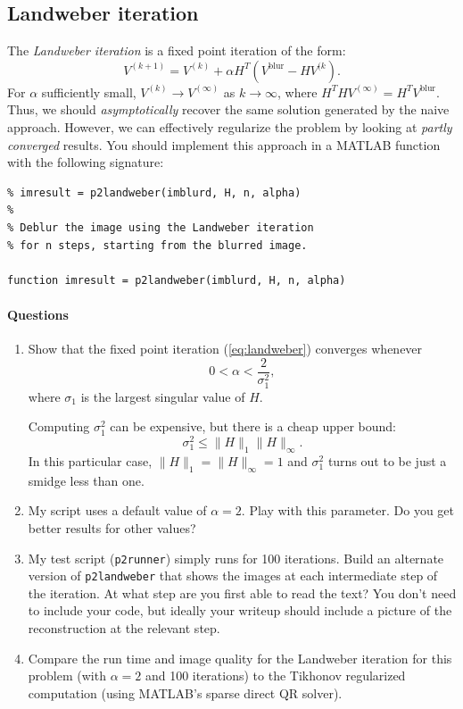 \documentclass[12pt, leqno]{article} %
\begin{document}
\subsection{Landweber iteration}

The {\em Landweber iteration} is a fixed point iteration of the form:
\begin{equation}
  V^{(k+1)} = V^{(k)} + \alpha H^T (V^{\mathrm{blur}}-H V^{(k}).
  \label{eq:landweber}
\end{equation}
For $\alpha$ sufficiently small, $V^{(k)} \rightarrow V^{(\infty)}$ as
$k \rightarrow \infty$, where $H^T H V^{(\infty)} = H^T
V^{\mathrm{blur}}$.  Thus, we should {\em asymptotically} recover the
same solution generated by the naive approach.  However, we can
effectively regularize the problem by looking at {\em partly
  converged} results.  You should implement this approach in a MATLAB
function with the following signature:
\begin{lstlisting}
% imresult = p2landweber(imblurd, H, n, alpha)
%
% Deblur the image using the Landweber iteration
% for n steps, starting from the blurred image.

function imresult = p2landweber(imblurd, H, n, alpha)
\end{lstlisting}

\paragraph*{Questions}

\begin{enumerate}
\item
  Show that the fixed point iteration (\ref{eq:landweber}) converges whenever
  \[
    0 < \alpha < \frac{2}{\sigma_1^2},
  \]
  where $\sigma_1$ is the largest singular value of $H$.

  Computing $\sigma_1^2$ can be expensive, but there is a cheap upper
  bound:
  \[
  \sigma_1^2 \leq \|H\|_1 \|H\|_{\infty}.
  \]
  In this particular case, $\|H\|_1 = \|H\|_{\infty} = 1$ and
  $\sigma_1^2$ turns out to be just a smidge less than one.

\item
  My script uses a default value of $\alpha = 2$.  Play with this
  parameter.  Do you get better results for other values?
\item
  My test script ({\tt p2runner}) simply runs for 100 iterations.
  Build an alternate version of {\tt p2landweber} that shows the
  images at each intermediate step of the iteration.  At what step are
  you first able to read the text?  You don't need to include your
  code, but ideally your writeup should include a picture of the
  reconstruction at the relevant step.
\item
  Compare the run time and image quality for the Landweber iteration
  for this problem (with $\alpha = 2$ and 100 iterations) to the 
  Tikhonov regularized computation (using MATLAB's sparse direct QR
  solver).
\end{enumerate}
\end{document}
